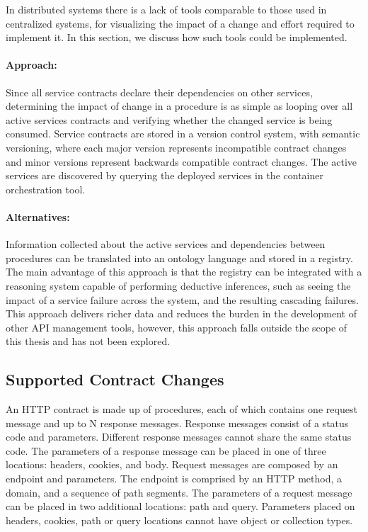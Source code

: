In distributed systems there is a lack of tools
comparable to those used in centralized systems, for visualizing the impact of a change and effort required to implement it.
In this section, we discuss how such tools could be implemented.

\paragraph{Approach:}
Since all service contracts declare their dependencies on other services, determining the impact of change in a procedure is as simple as
looping over all active services contracts and verifying whether the changed service is being consumed.
Service contracts are stored in a version control system, with semantic versioning, where
each major version represents incompatible contract changes and minor versions represent backwards compatible contract changes.
The active services are discovered by querying the deployed services in the container orchestration tool.

\paragraph{Alternatives:}
Information collected about the active services and dependencies between procedures can be translated into an ontology language and stored in a registry.
The main advantage of this approach is that the registry can be integrated with a reasoning system capable of performing deductive inferences, such as
seeing the impact of a service failure across the system, and the resulting cascading failures.
This approach delivers richer data and reduces the burden in the development of other API management tools,
however, this approach falls outside the scope of this thesis and has not been explored.

\subsection{Supported Contract Changes} %
\label{sec:supported_contract_changes}

An HTTP contract is made up of procedures, each of which contains one request message and up to N response messages.
Response messages consist of a status code and parameters.
Different response messages cannot share the same status code.
The parameters of a response message can be placed in one of three locations: headers, cookies, and body.
Request messages are composed by an endpoint and parameters.
The endpoint is comprised by an HTTP method, a domain, and a sequence of path segments.
The parameters of a request message can be placed in two additional locations: path and query.
Parameters placed on headers, cookies, path or query locations cannot have object or collection types.

